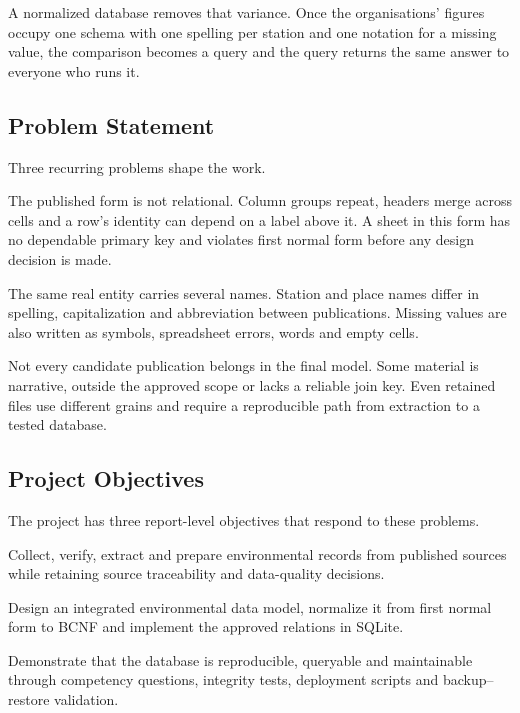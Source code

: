 A normalized database removes that variance. Once the organisations' figures
occupy one schema with one spelling per station and one notation for a missing
value, the comparison becomes a query and the query returns the same answer to
everyone who runs it.

\subsection{Problem Statement}
\label{subsec:ps}

Three recurring problems shape the work.

\begin{description}[leftmargin=1.15cm,style=nextline]
  \item[P1] The published form is not relational. Column groups repeat, headers
  merge across cells and a row's identity can depend on a label above it. A
  sheet in this form has no dependable primary key and violates first normal
  form before any design decision is made.
  \item[P2] The same real entity carries several names. Station and place names
  differ in spelling, capitalization and abbreviation between publications.
  Missing values are also written as symbols, spreadsheet errors, words and
  empty cells.
  \item[P3] Not every candidate publication belongs in the final model. Some
  material is narrative, outside the approved scope or lacks a reliable join
  key. Even retained files use different grains and require a reproducible path
  from extraction to a tested database.
\end{description}

\subsection{Project Objectives}
\label{subsec:objectives}

The project has three report-level objectives that respond to these problems.

\begin{description}[leftmargin=1.25cm,style=nextline]
  \item[OB1] Collect, verify, extract and prepare environmental records from
  published sources while retaining source traceability and data-quality
  decisions.
  \item[OB2] Design an integrated environmental data model, normalize it from
  first normal form to BCNF and implement the approved relations in SQLite.
  \item[OB3] Demonstrate that the database is reproducible, queryable and
  maintainable through competency questions, integrity tests, deployment
  scripts and backup--restore validation.
\end{description}

